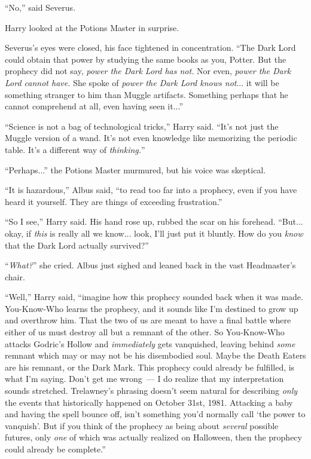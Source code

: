 ``No,'' said Severus.

Harry looked at the Potions Master in surprise.

Severus's eyes were closed, his face tightened in concentration. ``The Dark Lord could obtain that power by studying the same books as you, Potter. But the prophecy did not say, \emph{power the Dark Lord has not.} Nor even, \emph{power the Dark Lord cannot have.} She spoke of \emph{power the Dark Lord knows not}... it will be something stranger to him than Muggle artifacts. Something perhaps that he cannot comprehend at all, even having seen it...''

``Science is not a bag of technological tricks,'' Harry said. ``It's not just the Muggle version of a wand. It's not even knowledge like memorizing the periodic table. It's a different way of \emph{thinking.}''

``Perhaps...'' the Potions Master murmured, but his voice was skeptical.

``It is hazardous,'' Albus said, ``to read too far into a prophecy, even if you have heard it yourself. They are things of exceeding frustration.''

``So I see,'' Harry said. His hand rose up, rubbed the scar on his forehead. ``But... okay, if \emph{this} is really all we know... look, I'll just put it bluntly. How do you \emph{know} that the Dark Lord actually survived?''

``\emph{What?}'' she cried. Albus just sighed and leaned back in the vast Headmaster's chair.

``Well,'' Harry said, ``imagine how this prophecy sounded back when it was made. You-Know-Who learns the prophecy, and it sounds like I'm destined to grow up and overthrow him. That the two of us are meant to have a final battle where either of us must destroy all but a remnant of the other. So You-Know-Who attacks Godric's Hollow and \emph{immediately} gets vanquished, leaving behind \emph{some} remnant which may or may not be his disembodied soul. Maybe the Death Eaters are his remnant, or the Dark Mark. This prophecy could already be fulfilled, is what I'm saying. Don't get me wrong~--- I do realize that my interpretation sounds stretched. Trelawney's phrasing doesn't seem natural for describing \emph{only} the events that historically happened on October 31st, 1981. Attacking a baby and having the spell bounce off, isn't something you'd normally call `the power to vanquish'. But if you think of the prophecy as being about \emph{several} possible futures, only \emph{one} of which was actually realized on Halloween, then the prophecy could already be complete.''

